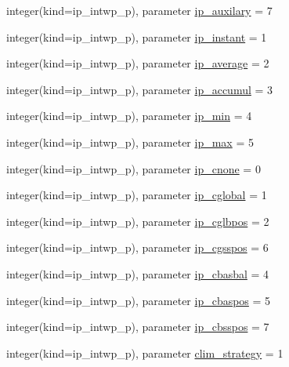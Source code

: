 \begin{DoxyCompactItemize}
\item 
integer(kind=ip\+\_\+intwp\+\_\+p), parameter \hyperlink{namespacemod__oasis__parameters_a4e90463865a09309212e947e8c8546ac}{ip\+\_\+auxilary} = 7
\item 
integer(kind=ip\+\_\+intwp\+\_\+p), parameter \hyperlink{namespacemod__oasis__parameters_a1028581caadcb9d7506b25c6cd3efd01}{ip\+\_\+instant} = 1
\item 
integer(kind=ip\+\_\+intwp\+\_\+p), parameter \hyperlink{namespacemod__oasis__parameters_a5e40e91da22fca8f2b6a9d4f1c1ace5d}{ip\+\_\+average} = 2
\item 
integer(kind=ip\+\_\+intwp\+\_\+p), parameter \hyperlink{namespacemod__oasis__parameters_adfaf98517b8396e4ba667f2f8bcd0ed5}{ip\+\_\+accumul} = 3
\item 
integer(kind=ip\+\_\+intwp\+\_\+p), parameter \hyperlink{namespacemod__oasis__parameters_a194cfc3b7f2d515492e04fd6e8931c60}{ip\+\_\+min} = 4
\item 
integer(kind=ip\+\_\+intwp\+\_\+p), parameter \hyperlink{namespacemod__oasis__parameters_abe7b7d586b50bd7c7d77c7834efa2801}{ip\+\_\+max} = 5
\item 
integer(kind=ip\+\_\+intwp\+\_\+p), parameter \hyperlink{namespacemod__oasis__parameters_ae043e4e2c2b7f04fec7d8c061ef52934}{ip\+\_\+cnone} = 0
\item 
integer(kind=ip\+\_\+intwp\+\_\+p), parameter \hyperlink{namespacemod__oasis__parameters_ae251e3ac1c9c82ae5db2a768d2d59d5f}{ip\+\_\+cglobal} = 1
\item 
integer(kind=ip\+\_\+intwp\+\_\+p), parameter \hyperlink{namespacemod__oasis__parameters_aec700ad0c6a11dd35e5d6c2afb745fd0}{ip\+\_\+cglbpos} = 2
\item 
integer(kind=ip\+\_\+intwp\+\_\+p), parameter \hyperlink{namespacemod__oasis__parameters_a49f38ac3b4cada9ce9b7f5aa8b57f4a0}{ip\+\_\+cgsspos} = 6
\item 
integer(kind=ip\+\_\+intwp\+\_\+p), parameter \hyperlink{namespacemod__oasis__parameters_aaa7ead98ff7d53acfd539a32fca9e2c7}{ip\+\_\+cbasbal} = 4
\item 
integer(kind=ip\+\_\+intwp\+\_\+p), parameter \hyperlink{namespacemod__oasis__parameters_a3b96d31bbe142d84df2b93880498936f}{ip\+\_\+cbaspos} = 5
\item 
integer(kind=ip\+\_\+intwp\+\_\+p), parameter \hyperlink{namespacemod__oasis__parameters_a2199bfd0d49116fed576cec76f63372b}{ip\+\_\+cbsspos} = 7
\item 
integer(kind=ip\+\_\+intwp\+\_\+p), parameter \hyperlink{namespacemod__oasis__parameters_a611cae6f3c65a75f26e76b2f88f34037}{clim\+\_\+strategy} = 1

\end{DoxyCompactItemize}
